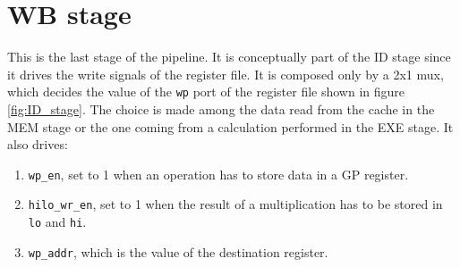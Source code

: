 \chapter{WB stage}
\label{chap:wb}

This is the last stage of the pipeline. It is conceptually part of the ID stage since it drives the write signals of the register file.
It is composed only by a 2x1 mux, which decides the value of the \verb|wp| port of the register file shown in figure \ref{fig:ID_stage}.
The choice is made among the data read from the cache in the MEM stage or the one coming from a calculation performed in the EXE stage.
It also drives:

\begin{enumerate}
    \item \verb|wp_en|, set to 1 when an operation has to store data in a GP register.
    \item \verb|hilo_wr_en|, set to 1 when the result of a multiplication has to be stored in \verb|lo| and \verb|hi|.
    \item \verb|wp_addr|, which is the value of the destination register.
\end{enumerate}